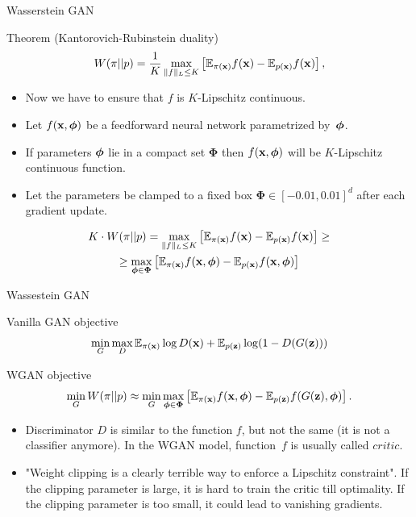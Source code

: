 \begin{frame}{Wasserstein GAN}
		\begin{block}{Theorem (Kantorovich-Rubinstein duality)}
		\[
			W(\pi || p) = \frac{1}{K} \max_{\| f \|_L \leq K} \left[ \mathbb{E}_{\pi(\mathbf{x})} f(\mathbf{x})  - \mathbb{E}_{p(\mathbf{x})} f(\mathbf{x})\right],
		\]
	\end{block}
	\begin{itemize}
		\item Now we have to ensure that $f$ is $K$-Lipschitz continuous.
		\item Let $f(\mathbf{x}, \boldsymbol{\phi})$ be a feedforward neural network parametrized by~$\boldsymbol{\phi}$.
		\item If parameters $\boldsymbol{\phi}$ lie in a compact set $\boldsymbol{\Phi}$ then $f(\mathbf{x}, \boldsymbol{\phi})$ will be $K$-Lipschitz continuous function. 
		\item Let the parameters be clamped to a fixed box $\boldsymbol{\Phi} \in [-0.01, 0.01]^d$ after each gradient update.
	\end{itemize}
	\begin{multline*}
		 K \cdot W(\pi || p) = \max_{\| f \|_L \leq K} \left[ \mathbb{E}_{\pi(\mathbf{x})} f(\mathbf{x})  - \mathbb{E}_{p(\mathbf{x})} f(\mathbf{x})\right] \geq \\  \geq \max_{\boldsymbol{\phi} \in \boldsymbol{\Phi}} \left[ \mathbb{E}_{\pi(\mathbf{x})} f(\mathbf{x}, \boldsymbol{\phi})  - \mathbb{E}_{p(\mathbf{x})} f(\mathbf{x}, \boldsymbol{\phi} )\right]
	\end{multline*}

\end{frame}
\begin{frame}{Wassestein GAN}
	\begin{block}{Vanilla GAN objective}
		\vspace{-0.2cm}
		\[
			\min_{G} \max_D \mathbb{E}_{\pi(\mathbf{x})} \log D(\mathbf{x}) + \mathbb{E}_{p(\mathbf{z})} \log (1 - D(G(\mathbf{z})))
		\]
		\vspace{-0.2cm}
	\end{block}
	\begin{block}{WGAN objective}
		\vspace{-0.6cm}
		\[
		\min_{G} W(\pi || p) \approx \min_{G} \max_{\boldsymbol{\phi} \in \boldsymbol{\Phi}} \left[ \mathbb{E}_{\pi(\mathbf{x})} f(\mathbf{x}, \boldsymbol{\phi})  - \mathbb{E}_{p(\mathbf{z})} f(G(\mathbf{z}), \boldsymbol{\phi} )\right].
		\]
	\end{block}
	\begin{itemize}
		\item Discriminator $D$ is similar to the function $f$, but not the same (it is not a classifier anymore). In the WGAN model, function~$f$ is usually called $\textit{critic}$.
		\item "Weight clipping is a clearly terrible way to enforce a Lipschitz constraint". If the clipping parameter is large, it is hard to train the critic till optimality. If the clipping parameter is too small, it could lead to vanishing gradients.
	\end{itemize}

\end{frame}
